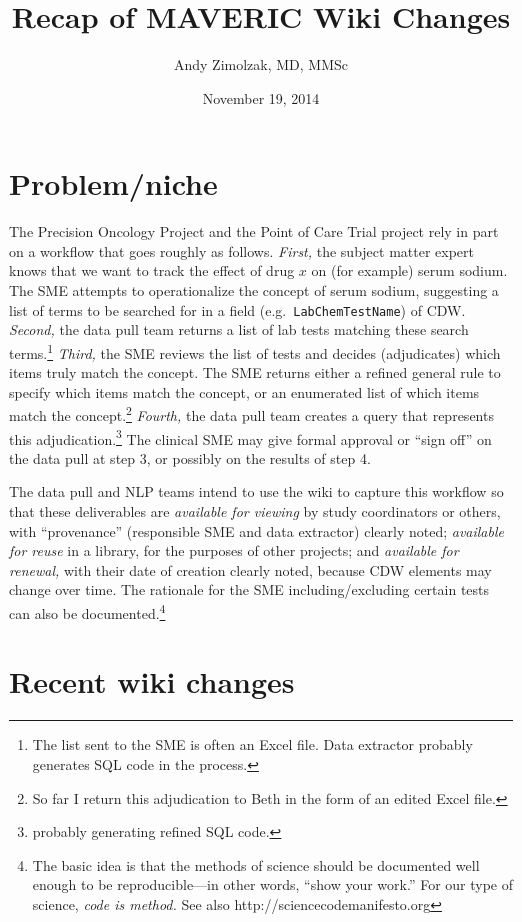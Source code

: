 \documentclass{tufte-handout}
\title{Recap of MAVERIC Wiki Changes}
\author{Andy Zimolzak, MD, MMSc}
\date{November 19, 2014}
\begin{document}
\maketitle

\section{Problem/niche}

The Precision Oncology Project and the Point of Care Trial project
rely in part on a workflow that goes roughly as follows. \emph{First,}
the subject matter expert knows that we want to track the effect of
drug $x$ on (for example) serum sodium. The SME attempts to
operationalize the concept of serum sodium, suggesting a list of terms
to be searched for in a field (e.g.\ \texttt{LabChemTestName}) of CDW.
\emph{Second,} the data pull team returns a list of lab tests matching
these search terms.\footnote{The list sent to the SME is often an
  Excel file. Data extractor probably generates SQL code in the
  process.} \emph{Third,} the SME reviews the list of tests and
decides (adjudicates) which items truly match the concept. The SME
returns either a refined general rule to specify which items match the
concept, or an enumerated list of which items match the
concept.\footnote{So far I return this adjudication to Beth in the
  form of an edited Excel file.} \emph{Fourth,} the data pull team
creates a query that represents this adjudication.\footnote{probably
  generating refined SQL code.} The clinical SME may give formal
approval or ``sign off'' on the data pull at step 3, or possibly on
the results of step 4.

The data pull and NLP teams intend to use the wiki to capture this
workflow so that these deliverables are \emph{available for viewing}
by study coordinators or others, with ``provenance'' (responsible SME
and data extractor) clearly noted; \emph{available for reuse} in a
library, for the purposes of other projects; and \emph{available for
  renewal,} with their date of creation clearly noted, because CDW
elements may change over time. The rationale for the SME
including/excluding certain tests can also be documented.\footnote{The
  basic idea is that the methods of science should be documented well
  enough to be reproducible---in other words, ``show your work.'' For
  our type of science, \emph{code is method.} See also
  http://sciencecodemanifesto.org}

\section{Recent wiki changes} 
\end{document}
